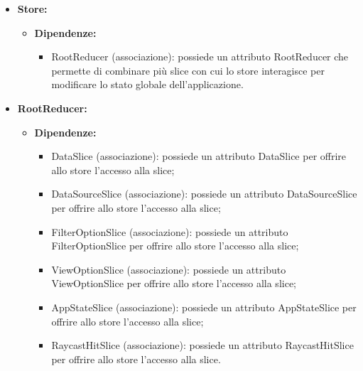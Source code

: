 \begin{itemize}
    \item \textbf{Store:}
          \begin{itemize}
              \item \textbf{Dipendenze:}
                    \begin{itemize}
                        \item RootReducer (associazione): possiede un attributo RootReducer che permette di
                              combinare più slice con cui lo store interagisce per modificare lo stato
                              globale dell'applicazione.
                    \end{itemize}
          \end{itemize}

    \item \textbf{RootReducer:}
          \begin{itemize}
              \item \textbf{Dipendenze:}
                    \begin{itemize}
                        \item DataSlice (associazione): possiede un attributo DataSlice per offrire allo
                              store l'accesso alla slice;
                        \item DataSourceSlice (associazione): possiede un attributo DataSourceSlice per
                              offrire allo store l'accesso alla slice;
                        \item FilterOptionSlice (associazione): possiede un attributo FilterOptionSlice per
                              offrire allo store l'accesso alla slice;
                        \item ViewOptionSlice (associazione): possiede un attributo ViewOptionSlice per
                              offrire allo store l'accesso alla slice;
                        \item AppStateSlice (associazione): possiede un attributo AppStateSlice per offrire
                              allo store l'accesso alla slice;
                        \item RaycastHitSlice (associazione): possiede un attributo RaycastHitSlice per
                              offrire allo store l'accesso alla slice.
                    \end{itemize}
          \end{itemize}
\end{itemize}

